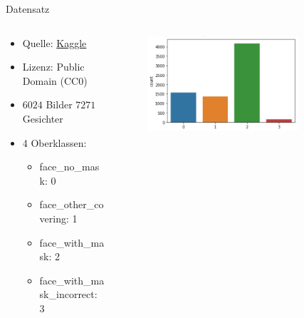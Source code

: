 \documentclass[aspectratio=1610, 9pt]{beamer}
\begin{document}
\begin{frame}{Datensatz}
  \begin{columns}
    \begin{column}{0.48\textwidth}
      \begin{itemize}
        \item Quelle: \href{https://www.kaggle.com/wobotintelligence/face-mask-detection-dataset/data}{Kaggle}
        \item Lizenz: Public Domain (CC0)
        \item $6024$ Bilder \textrightarrow $7271$ Gesichter
        \item 4 Oberklassen:
        \begin{itemize}
          \item face\_no\_mask: 0
          \item face\_other\_covering: 1
          \item face\_with\_mask: 2
          \item face\_with\_mask\_incorrect: 3
        \end{itemize}
        \end{itemize}
    \end{column}
    \begin{column}{0.48\textwidth}
      \begin{figure}
        \centering
        \includegraphics[width = 0.8\textwidth]{images/Verteilung.png}
      \end{figure}
    \end{column}
  \end{columns}
\end{frame}
\end{document}
